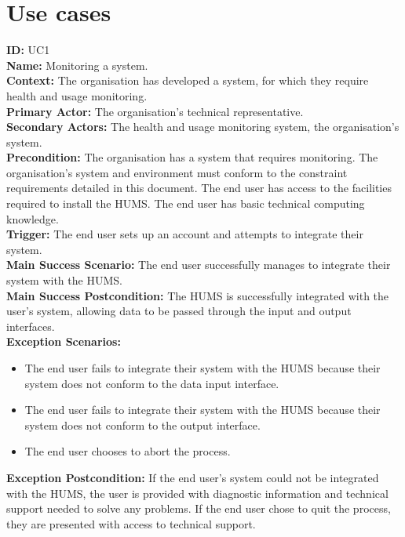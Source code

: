 \documentclass[10pt,a4paper]{article}
\begin{document}
\section{Use cases}
\noindent \textbf{ID:} UC1\\
\textbf{Name:} Monitoring a system.\\
\textbf{Context:} The organisation has developed a system, for which they require health and usage monitoring.\\
\textbf{Primary Actor:} The organisation's technical representative.\\
\textbf{Secondary Actors:} The health and usage monitoring system, the organisation's system.\\
\textbf{Precondition:}  The organisation has a system that requires monitoring. The organisation's system and environment must conform to the constraint requirements detailed in this document. The end user has access to the facilities required to install the HUMS. The end user has basic technical computing knowledge.\\
\textbf{Trigger:} The end user sets up an account and attempts to integrate their system.\\
\textbf{Main Success Scenario:} The end user successfully manages to integrate their system with the HUMS.\\
\textbf{Main Success Postcondition:} The HUMS is successfully integrated with the user's system, allowing data to be passed through the input and output interfaces.\\
\textbf{Exception Scenarios:}
\begin{itemize}
\item The end user fails to integrate their system with the HUMS because their system does not conform to the data input interface.
\item The end user fails to integrate their system with the HUMS because their system does not conform to the output interface.
\item The end user chooses to abort the process.
\end{itemize}
\textbf{Exception Postcondition:} If the end user's system could not be integrated with the HUMS, the user is provided with diagnostic information and technical support needed to solve any problems. If the end user chose to quit the process, they are presented with access to technical support.\\\\
\end{document}
